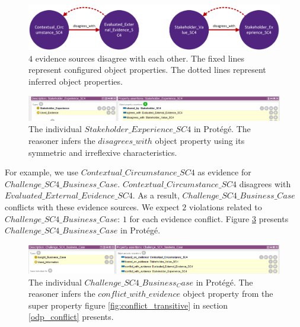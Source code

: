 \begin{figure}[H]
\centering
  \includegraphics[width=15cm]{../../Images/05_Validation/05_SC4_Conflict_Inference.png}
  \caption{$4$ evidence sources disagree with each other. The fixed lines represent configured object properties. The dotted lines represent inferred object properties.}
  \label{fig:RP_SC4_Conflict}
\end{figure}

\begin{figure}[H]
\centering
  \includegraphics[width=17cm]{../../Images/05_Validation/05_RP_SC4_Stakeholder_Experience_SC4.png}
  \caption{The individual $Stakeholder\_Experience\_SC4$ in Prot\'eg\'e. The reasoner infers the $disagrees\_with$ object property using its symmetric and irreflexive characteristics.}
  \label{fig:RP_SC4_Stakeholder_Experience_SC4}
\end{figure}

For example, we use $Contextual\_Circumstance\_SC4$ as evidence for $Challenge\_SC4\_Business\_Case$. $Contextual\_Circumstance\_SC4$ disagrees with $Evaluated\_External\_Evidence\_SC4$. As a result, $Challenge\_SC4\_Business\_Case$ conflicts with these evidence sources. We expect $2$ violations related to $Challenge\_SC4\_Business\_Case$: $1$ for each evidence conflict. Figure \ref{fig:RP_SC4_Protege_Challenge_SC4_Business_Case} presents $Challenge\_SC4\_Business\_Case$ in Prot\'eg\'e.

\begin{figure}[H]
\centering
  \includegraphics[width=17cm]{../../Images/05_Validation/05_RP_SC4_Challenge_SC4_Business_Case.png}
  \caption{The individual $Challenge\_SC4\_Business_Case$ in Prot\'eg\'e. The reasoner infers the $conflict\_with\_evidence$ object property from the super property figure \ref{fig:conflict_transitive} in section \ref{odp_conflict}  presents.}
  \label{fig:RP_SC4_Protege_Challenge_SC4_Business_Case}
\end{figure}

